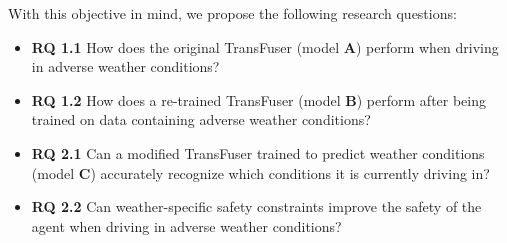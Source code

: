 With this objective in mind,
we propose the following research questions:
\begin{itemize}
    \item \textbf{RQ 1.1} How does the original TransFuser (model \textbf{A}) perform when driving in adverse weather conditions?
    \item \textbf{RQ 1.2} How does a re-trained TransFuser (model \textbf{B}) perform after being trained on data containing adverse weather conditions?
    \item \textbf{RQ 2.1} Can a modified TransFuser trained to predict weather conditions (model \textbf{C}) accurately recognize which conditions it is currently driving in?
    \item \textbf{RQ 2.2} Can weather-specific safety constraints improve the safety of the agent when driving in adverse weather conditions?
\end{itemize}
